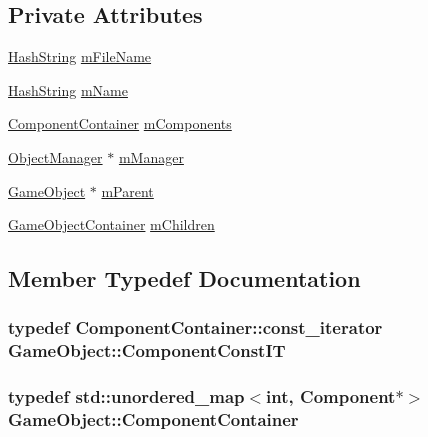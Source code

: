\subsection*{Private Attributes}
\begin{DoxyCompactItemize}
\item 
\hyperlink{classHashString}{Hash\+String} \hyperlink{classGameObject_ac9cf51e46f7a63be42d4b2ee88777999}{m\+File\+Name}
\item 
\hyperlink{classHashString}{Hash\+String} \hyperlink{classGameObject_abf896795ad30b2e2a3087ca7dc54ccf0}{m\+Name}
\item 
\hyperlink{classGameObject_a1b427560e7cbc5b2849ceec5f0780231}{Component\+Container} \hyperlink{classGameObject_a8706053a7d9e9e16d2932ddd174d0b68}{m\+Components}
\item 
\hyperlink{classObjectManager}{Object\+Manager} $\ast$ \hyperlink{classGameObject_a712b44bcb5814c6924bdb3f399f43969}{m\+Manager}
\item 
\hyperlink{classGameObject}{Game\+Object} $\ast$ \hyperlink{classGameObject_a606e12729c1d5f4b2c72abb15d849afa}{m\+Parent}
\item 
\hyperlink{classGameObject_aeef18cd85b020970fc7e33bb1d0f834e}{Game\+Object\+Container} \hyperlink{classGameObject_a2f2256cb6c1402291d28595f3a83fd3b}{m\+Children}
\end{DoxyCompactItemize}


\subsection{Member Typedef Documentation}
\subsubsection[{\texorpdfstring{Component\+Const\+IT}{ComponentConstIT}}]{\setlength{\rightskip}{0pt plus 5cm}typedef Component\+Container\+::const\+\_\+iterator {\bf Game\+Object\+::\+Component\+Const\+IT}}\hypertarget{classGameObject_a2eb725c491bcd045fc1b533f36addddf}{}\label{classGameObject_a2eb725c491bcd045fc1b533f36addddf}
\subsubsection[{\texorpdfstring{Component\+Container}{ComponentContainer}}]{\setlength{\rightskip}{0pt plus 5cm}typedef std\+::unordered\+\_\+map$<$int, {\bf Component}$\ast$$>$ {\bf Game\+Object\+::\+Component\+Container}}\hypertarget{classGameObject_a1b427560e7cbc5b2849ceec5f0780231}{}\label{classGameObject_a1b427560e7cbc5b2849ceec5f0780231}
